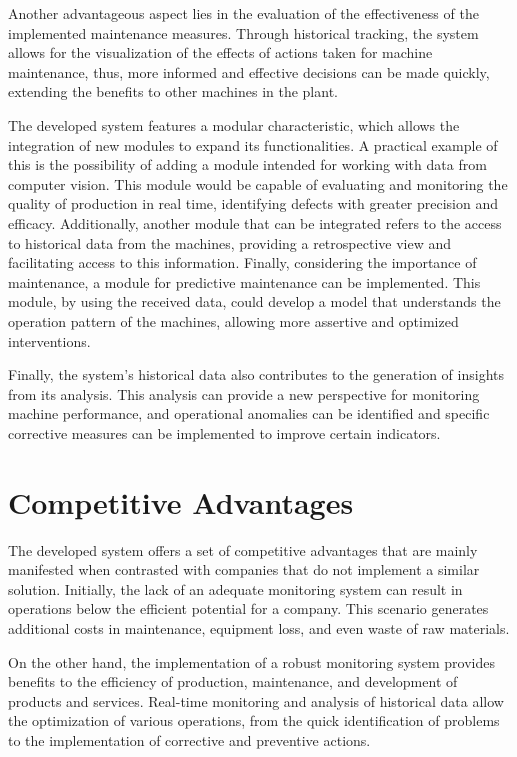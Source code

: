 Another advantageous aspect lies in the evaluation of the effectiveness of the implemented maintenance measures. Through historical tracking, the system allows for the visualization of the effects of actions taken for machine maintenance, thus, more informed and effective decisions can be made quickly, extending the benefits to other machines in the plant.

The developed system features a modular characteristic, which allows the integration of new modules to expand its functionalities. A practical example of this is the possibility of adding a module intended for working with data from computer vision. This module would be capable of evaluating and monitoring the quality of production in real time, identifying defects with greater precision and efficacy. Additionally, another module that can be integrated refers to the access to historical data from the machines, providing a retrospective view and facilitating access to this information. Finally, considering the importance of maintenance, a module for predictive maintenance can be implemented. This module, by using the received data, could develop a model that understands the operation pattern of the machines, allowing more assertive and optimized interventions.

Finally, the system's historical data also contributes to the generation of insights from its analysis. This analysis can provide a new perspective for monitoring machine performance, and operational anomalies can be identified and specific corrective measures can be implemented to improve certain indicators.

\section{Competitive Advantages}\label{sec:competitive}
The developed system offers a set of competitive advantages that are mainly manifested when contrasted with companies that do not implement a similar solution. Initially, the lack of an adequate monitoring system can result in operations below the efficient potential for a company. This scenario generates additional costs in maintenance, equipment loss, and even waste of raw materials.

On the other hand, the implementation of a robust monitoring system provides benefits to the efficiency of production, maintenance, and development of products and services. Real-time monitoring and analysis of historical data allow the optimization of various operations, from the quick identification of problems to the implementation of corrective and preventive actions.

